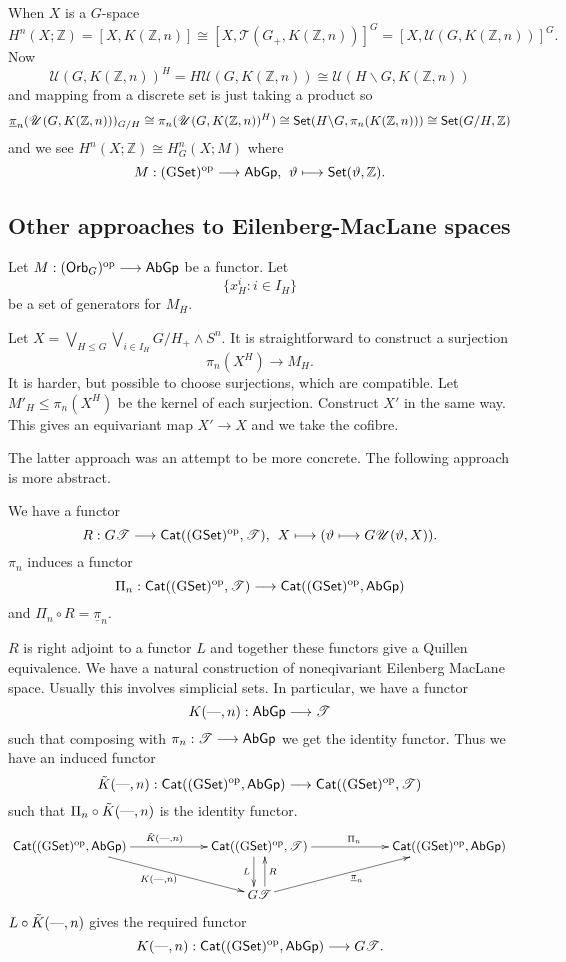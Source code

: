 \documentclass[11pt]{article}
\begin{document}
\begin{exmp*}
When $X$ is a $G$-space
\[H^n(X;\mathbb{Z})=[X,K(\mathbb{Z},n)]
\cong[X,\mathscr{T}(G_+,K(\mathbb{Z},n))]^G=
[X,\mathscr{U}(G,K(\mathbb{Z},n))]^G.\]
Now
\[\mathscr{U}(G,K(\mathbb{Z},n))^H=H\mathscr{U}(G,K(\mathbb{Z},n))
\cong\mathscr{U}(H\backslash G,K(\mathbb{Z},n))\]
and mapping from a discrete set is just taking a product so
\[\underline{\pi}_n(\mathscr{U}(G,K(\mathbb{Z},n)))_{G/H}\cong
\pi_n(\mathscr{U}(G,K(\mathbb{Z},n))^H)\cong
\operatorname{{\mathsf{Set}}}(H\backslash G,\pi_n(K(\mathbb{Z},n)))\cong\operatorname{{\mathsf{Set}}}(G/H,\mathbb{Z})\]
and we see $H^n(X;\mathbb{Z})\cong H^n_G(X;M)$ where
\[M:(\operatorname{{G\mathsf{Set}}})^{\textup{op}}\longrightarrow\operatorname{{\mathsf{AbGp}}},
\hspace{4pt}
\vartheta\longmapsto\operatorname{{\mathsf{Set}}}(\vartheta,\mathbb{Z}).\]
\end{exmp*}






\subsection*{Other approaches to Eilenberg-MacLane spaces}
Let $M:(\operatorname{{\mathsf{Orb}}}_G)^{\textup{op}}\longrightarrow\operatorname{{\mathsf{AbGp}}}$ be a functor. Let
\[\{x^i_H:i\in I_H\}\]
be a set of generators for $M_H$.

Let $X=\bigvee_{H\leq G}\bigvee_{i\in I_H}G/H_+\wedge S^n$. It is straightforward to construct a surjection
\[\pi_n(X^H)\to M_H.\]
It is harder, but possible to choose surjections, which are compatible. Let $M'_H\leq\pi_n(X^H)$ be the kernel of each surjection. Construct $X'$ in the same way. This gives an equivariant map $X'\to X$ and we take the cofibre.

The latter approach was an attempt to be more concrete. The following approach is more abstract.

We have a functor
\[R:G\mathscr{T}\longrightarrow\operatorname{{\mathsf{Cat}}}
((\operatorname{{G\mathsf{Set}}})^{\textup{op}},\mathscr{T}),
\hspace{4pt}
X\longmapsto(\vartheta\longmapsto G\mathscr{U}(\vartheta,X)).\]
$\pi_n$ induces a functor
\[\Pi_n:\operatorname{{\mathsf{Cat}}}
((\operatorname{{G\mathsf{Set}}})^{\textup{op}},\mathscr{T})\longrightarrow
\operatorname{{\mathsf{Cat}}}
((\operatorname{{G\mathsf{Set}}})^{\textup{op}},\operatorname{{\mathsf{AbGp}}})\]
and $\Pi_n\circ R=\underline{\pi}_n$.

$R$ is right adjoint to a functor $L$ and together these functors give a Quillen equivalence. We have a natural construction of noneqivariant Eilenberg MacLane space. Usually this involves simplicial sets. In particular, we have a functor
\[K(\textup{---},n):\operatorname{{\mathsf{AbGp}}}\longrightarrow\mathscr{T}\]
such that composing with $\pi_n:\mathscr{T}\longrightarrow\operatorname{{\mathsf{AbGp}}}$ we get the identity functor. Thus we have an induced functor
\[\tilde{K}(\textup{---},n):\operatorname{{\mathsf{Cat}}}((\operatorname{{G\mathsf{Set}}})^{\textup{op}},\operatorname{{\mathsf{AbGp}}})\longrightarrow
\operatorname{{\mathsf{Cat}}}((\operatorname{{G\mathsf{Set}}})^{\textup{op}},\mathscr{T})\]
such that $\Pi_n\circ\tilde{K}(\textup{---},n)$ is the identity functor.
\[\xymatrixcolsep{5pc}\xymatrix{
\Cat
((\GSet)^{\textup{op}},\AbGp)
\ar[r]^{\tilde{K}(\DASH,n)}\ar[rd]_{K(\DASH,n)}
&\Cat
((\GSet)^{\textup{op}},\mathscr{T})\ar[r]^{\Pi_n}\ar@<-1ex>[d]_L
&\Cat
((\GSet)^{\textup{op}},\AbGp)\\
&G\mathscr{T}\ar@<-1ex>[u]_R\ar[ru]_{\underline{\pi}_n}&}\]
$L\circ\tilde{K}(\textup{---},n)$ gives the required functor
\[K(\textup{---},n):\operatorname{{\mathsf{Cat}}}((\operatorname{{G\mathsf{Set}}})^{\textup{op}},\operatorname{{\mathsf{AbGp}}})\longrightarrow
G\mathscr{T}.\]
\end{document}
